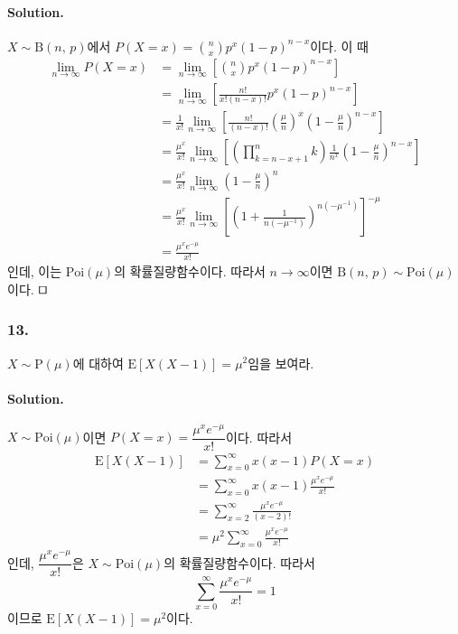 \paragraph{Solution.} $X\sim\mathrm{B}\left(n,\,p\right)$에서 $P\left(X=x\right) = \displaystyle\binom{n}{x}p^x\left(1-p\right)^{n-x}$이다. 이 때
\begin{align*}
	\lim_{n\rightarrow\infty} P\left(X=x\right) &= \lim_{n\rightarrow\infty}\left[\binom{n}{x}p^x\left(1-p\right)^{n-x}\right] \\
	&= \lim_{n\rightarrow\infty}\left[ \frac{n!}{x!\left(n-x\right)!}p^x\left(1-p\right)^{n-x} \right] \\
	&= \frac{1}{x!} \lim_{n\rightarrow\infty}\left[ \frac{n!}{\left(n-x\right)!}\left(\frac{\mu}{n}\right)^x\left(1-\frac{\mu}{n}\right)^{n-x} \right] \\
	&= \frac{\mu^x}{x!} \lim_{n\rightarrow\infty}\left[ \left(\prod_{k=n-x+1}^{n} k\right)\frac{1}{n^x}\left(1-\frac{\mu}{n}\right)^{n-x} \right] \\
	&= \frac{\mu^x}{x!} \lim_{n\rightarrow\infty}\left(1-\frac{\mu}{n}\right)^{n} \\
	&= \frac{\mu^x}{x!} \lim_{n\rightarrow\infty}\left[\left(1+\frac{1}{n\left(-\mu^{-1}\right)}\right)^{n\left(-\mu^{-1}\right)}\right]^{-\mu} \\
	&= \frac{\mu^x e^{-\mu}}{x!}
\end{align*}
인데, 이는 $\mathrm{Poi}\left(\mu\right)$의 확률질량함수이다.
따라서 $n\rightarrow\infty$이면 $\mathrm{B}\left(n,\,p\right) \sim \mathrm{Poi}\left(\mu\right)$이다. $\qed$

\subsubsection{13.} $X\sim\mathrm{P}\left(\mu\right)$에 대하여 $\mathrm{E}\left[X\left(X-1\right)\right]=\mu^2$임을 보여라.

\paragraph{Solution.} $X\sim\mathrm{Poi}\left(\mu\right)$이면 $P\left(X=x\right) = \dfrac{\mu^x e^{-\mu}}{x!}$이다. 따라서
\begin{align*}
	\mathrm{E}\left[X\left(X-1\right)\right] &= \sum_{x=0}^{\infty} x\left(x-1\right) P\left(X=x\right) \\
	&= \sum_{x=0}^{\infty} x\left(x-1\right) \frac{\mu^x e^{-\mu}}{x!} \\
	&= \sum_{x=2}^{\infty} \frac{\mu^x e^{-\mu}}{\left(x-2\right)!} \\
	&= \mu^2 \sum_{x=0}^{\infty} \frac{\mu^x e^{-\mu}}{x!}
\end{align*}
인데, $\dfrac{\mu^x e^{-\mu}}{x!}$은 $X\sim\mathrm{Poi}\left(\mu\right)$의 확률질량함수이다. 따라서
\[\sum_{x=0}^{\infty} \frac{\mu^x e^{-\mu}}{x!}=1\]
이므로 $\mathrm{E}\left[X\left(X-1\right)\right]=\mu^2$이다.